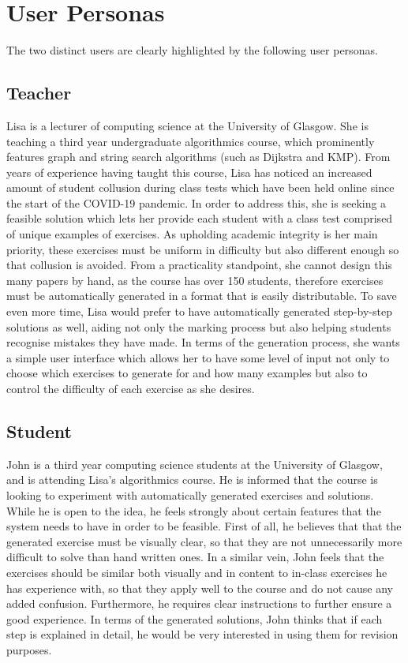 \documentclass{l4proj}
\begin{document}
\section{User Personas}

The two distinct users are clearly highlighted by the following user personas.

\subsection{Teacher}

Lisa is a lecturer of computing science at the University of Glasgow. She is teaching a third year undergraduate algorithmics course, which prominently features graph and string search algorithms (such as Dijkstra and KMP). From years of experience having taught this course, Lisa has noticed an increased amount of student collusion during class tests which have been held online since the start of the COVID-19 pandemic. In order to address this, she is seeking a feasible solution which lets her provide each student with a class test comprised of unique examples of exercises. As upholding academic integrity is her main priority, these exercises must be uniform in difficulty but also different enough so that collusion is avoided. From a practicality standpoint, she cannot design this many papers by hand, as the course has over 150 students, therefore exercises must be automatically generated in a format that is easily distributable. To save even more time, Lisa would prefer to have automatically generated step-by-step solutions as well, aiding not only the marking process but also helping students recognise mistakes they have made. In terms of the generation process, she wants a simple user interface which allows her to have some level of input not only to choose which exercises to generate for and how many examples but also to control the difficulty of each exercise as she desires.

\subsection{Student}

John is a third year computing science students at the University of Glasgow, and is attending Lisa's algorithmics course. He is informed that the course is looking to experiment with automatically generated exercises and solutions. While he is open to the idea, he feels strongly about certain features that the system needs to have in order to be feasible. First of all, he believes that that the generated exercise must be visually clear, so that they are not unnecessarily more difficult to solve than hand written ones. In a similar vein, John feels that the exercises should be similar both visually and in content to in-class exercises he has experience with, so that they apply well to the course and do not cause any added confusion. Furthermore, he requires clear instructions to further ensure a good experience. In terms of the generated solutions, John thinks that if each step is explained in detail, he would be very interested in using them for revision purposes.
\end{document}
